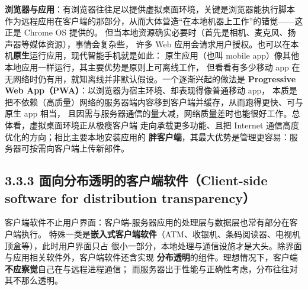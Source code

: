 \medskip\noindent\textbf{浏览器与应用}：有浏览器往往足以提供虚拟桌面环境，关键是浏览器能执行脚本
作为远程应用在客户端的那部分，从而大体营造“在本地机器上工作”的错觉——这正是 Chrome OS 提供的。
但当本地资源确实必要时（首先是相机、麦克风、扬声器等媒体资源），事情会复杂些，
许多 Web 应用会请求用户授权。也可以在本机\textbf{原生}运行应用，现代智能手机就是如此：
原生应用（也叫 mobile app）像其他本地应用一样运行，其主要优势是原则上可离线工作，
但看看有多少移动 app 在无网络时仍有用，就知离线并非默认假设。一个逐渐兴起的做法是
\textbf{Progressive Web App（PWA）}：以浏览器为宿主环境、却表现得像普通移动 app，
本质是把不依赖（高质量）网络的服务器端内容移到客户端并缓存，从而跑得更快、可与原生 app 相当，
且因需与服务器通信的量大减，网络质量差时也能很好工作。总体看，虚拟桌面环境正从极瘦客户端
走向承载更多功能、且把 Internet 通信高度优化的方向；相比主要本地安装应用的
\textbf{胖客户端}，其最大优势是管理更容易：服务器可按需向客户端上传新部件。

\begin{closeread}
\end{closeread}


\subsection*{3.3.3 面向分布透明的客户端软件（Client-side software for distribution transparency）}
客户端软件不止用户界面：客户端-服务器应用的处理层与数据层也常有部分在客户端执行。
特殊一类是\textbf{嵌入式客户端软件}（ATM、收银机、条码阅读器、电视机顶盒等），此时用户界面只占
很小一部分，本地处理与通信设施才是大头。除界面与应用相关软件外，客户端软件还含实现
\textbf{分布透明}的组件。理想情况下，客户端\textbf{不应察觉}自己在与远程进程通信；
而服务器出于性能与正确性考虑，分布往往对其不那么透明。

